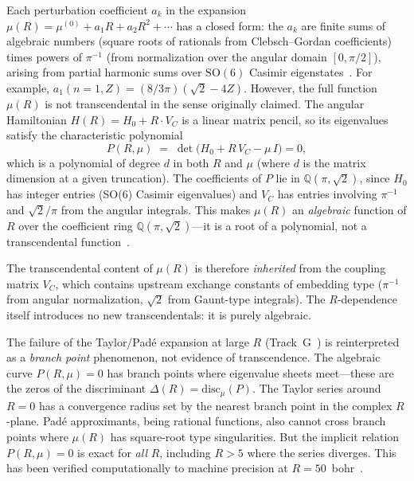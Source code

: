 \documentclass[aps,pra,twocolumn,superscriptaddress,longbibliography]{revtex4-2}
\begin{document}
Each perturbation coefficient $a_k$ in the expansion
$\mu(R) = \mu^{(0)} + a_1 R + a_2 R^2 + \cdots$ has a closed
form: the $a_k$ are finite sums of algebraic numbers (square
roots of rationals from Clebsch--Gordan coefficients) times
powers of $\pi^{-1}$ (from normalization over the angular domain
$[0, \pi/2]$), arising from partial harmonic sums over
$\mathrm{SO}(6)$ Casimir eigenstates~\cite{loutey_paper13}.
For example, $a_1(n{=}1, Z) = (8/3\pi)(\sqrt{2} - 4Z)$.
However, the full function $\mu(R)$ is not transcendental in the
sense originally claimed.  The angular Hamiltonian
$H(R) = H_0 + R \cdot V_C$ is a linear matrix pencil, so its
eigenvalues satisfy the characteristic polynomial
\begin{equation}
  P(R, \mu) \;=\; \det\!\bigl(H_0 + R\,V_C - \mu\,I\bigr) = 0,
  \label{eq:char_poly}
\end{equation}
which is a polynomial of degree $d$ in both $R$ and $\mu$ (where
$d$ is the matrix dimension at a given truncation).  The coefficients
of $P$ lie in $\mathbb{Q}(\pi, \sqrt{2})$, since $H_0$ has integer
entries (SO(6) Casimir eigenvalues) and $V_C$ has entries involving
$\pi^{-1}$ and $\sqrt{2}/\pi$ from the angular integrals.  This
makes $\mu(R)$ an \emph{algebraic} function of $R$ over the
coefficient ring $\mathbb{Q}(\pi, \sqrt{2})$---it is a root of
a polynomial, not a transcendental
function~\cite{loutey_track_p1}.

The transcendental content of $\mu(R)$ is therefore
\emph{inherited} from the coupling matrix $V_C$, which contains
upstream exchange constants of embedding type ($\pi^{-1}$ from
angular normalization, $\sqrt{2}$ from Gaunt-type integrals).
The $R$-dependence itself introduces no new transcendentals:
it is purely algebraic.

The failure of the Taylor/Pad\'e expansion at large $R$
(Track~G~\cite{loutey_track_g}) is reinterpreted as a
\emph{branch point} phenomenon, not evidence of transcendence.
The algebraic curve $P(R, \mu) = 0$ has branch points where
eigenvalue sheets meet---these are the zeros of the discriminant
$\Delta(R) = \mathrm{disc}_\mu(P)$.  The Taylor series around
$R = 0$ has a convergence radius set by the nearest branch point
in the complex $R$-plane.  Pad\'e approximants, being rational
functions, also cannot cross branch points where $\mu(R)$ has
square-root type singularities.  But the implicit relation
$P(R, \mu) = 0$ is exact for \emph{all} $R$, including $R > 5$
where the series diverges.  This has been verified computationally
to machine precision at $R = 50$~bohr~\cite{loutey_track_p1}.
\end{document}
